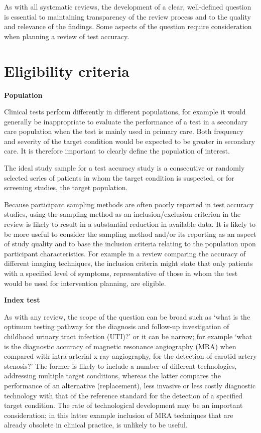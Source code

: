 \documentclass[
  11pt,
  a4paper,
  DIV=11,
  numbers=noendperiod]{scrreprt}
\begin{document}
As with all systematic reviews, the development of a clear, well-defined
question is essential to maintaining transparency of the review process
and to the quality and relevance of the findings. Some aspects of the
question require consideration when planning a review of test accuracy.

\section{Eligibility criteria}\label{eligibility-criteria-1}

\textbf{Population}

Clinical tests perform differently in different populations, for example
it would generally be inappropriate to evaluate the performance of a
test in a secondary care population when the test is mainly used in
primary care. Both frequency and severity of the target condition would
be expected to be greater in secondary care. It is therefore important
to clearly define the population of interest.

The ideal study sample for a test accuracy study is a consecutive or
randomly selected series of patients in whom the target condition is
suspected, or for screening studies, the target population.

Because participant sampling methods are often poorly reported in test
accuracy studies, using the sampling method as an inclusion/exclusion
criterion in the review is likely to result in a substantial reduction
in available data. It is likely to be more useful to consider the
sampling method and/or its reporting as an aspect of study quality and
to base the inclusion criteria relating to the population upon
participant characteristics. For example in a review comparing the
accuracy of different imaging techniques, the inclusion criteria might
state that only patients with a specified level of symptoms,
representative of those in whom the test would be used for intervention
planning, are eligible.

\textbf{Index test}

As with any review, the scope of the question can be broad such as `what
is the optimum testing pathway for the diagnosis and follow-up
investigation of childhood urinary tract infection (UTI)?' or it can be
narrow; for example `what is the diagnostic accuracy of magnetic
resonance angiography (MRA) when compared with intra-arterial x-ray
angiography, for the detection of carotid artery stenosis?' The former
is likely to include a number of different technologies, addressing
multiple target conditions, whereas the latter compares the performance
of an alternative (replacement), less invasive or less costly diagnostic
technology with that of the reference standard for the detection of a
specified target condition. The rate of technological development may be
an important consideration; in this latter example inclusion of MRA
techniques that are already obsolete in clinical practice, is unlikely
to be useful.
\end{document}

